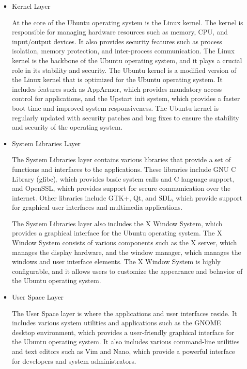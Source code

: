 \documentclass[conference]{IEEEtran}
\begin{document}
\begin{itemize}
    \item Kernel Layer

    At the core of the Ubuntu operating system is the Linux kernel. The kernel is responsible for managing hardware resources such as memory, CPU, and input/output devices. It also provides security features such as process isolation, memory protection, and inter-process communication. The Linux kernel is the backbone of the Ubuntu operating system, and it plays a crucial role in its stability and security.
    The Ubuntu kernel is a modified version of the Linux kernel that is optimized for the Ubuntu operating system. It includes features such as AppArmor, which provides mandatory access control for applications, and the Upstart init system, which provides a faster boot time and improved system responsiveness. The Ubuntu kernel is regularly updated with security patches and bug fixes to ensure the stability and security of the operating system.
    \linebreak
    \item System Libraries Layer

    The System Libraries layer contains various libraries that provide a set of functions and interfaces to the applications. These libraries include GNU C Library (glibc), which provides basic system calls and C language support, and OpenSSL, which provides support for secure communication over the internet. Other libraries include GTK+, Qt, and SDL, which provide support for graphical user interfaces and multimedia applications.

    The System Libraries layer also includes the X Window System, which provides a graphical interface for the Ubuntu operating system. The X Window System consists of various components such as the X server, which manages the display hardware, and the window manager, which manages the windows and user interface elements. The X Window System is highly configurable, and it allows users to customize the appearance and behavior of the Ubuntu operating system.
    \linebreak
    \item User Space Layer

    The User Space layer is where the applications and user interfaces reside. It includes various system utilities and applications such as the GNOME desktop environment, which provides a user-friendly graphical interface for the Ubuntu operating system. It also includes various command-line utilities and text editors such as Vim and Nano, which provide a powerful interface for developers and system administrators.


\end{itemize}
\end{document}
